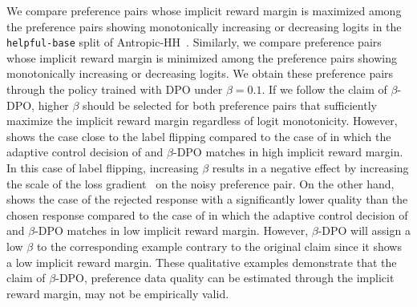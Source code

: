 We compare preference pairs whose implicit reward margin is maximized among the preference pairs showing monotonically increasing or decreasing logits in the \texttt{helpful-base} split of Antropic-HH~\cite{bai2022training}. Similarly, we compare preference pairs whose implicit reward margin is minimized among the preference pairs showing monotonically increasing or decreasing logits. We obtain these preference pairs through the policy trained with DPO under $\beta=0.1$. If we follow the claim of $\beta$-DPO, higher $\beta$ should be selected for both preference pairs that sufficiently maximize the implicit reward margin regardless of logit monotonicity. However,  shows the case close to the label flipping compared to the case of  in which the adaptive control decision of \method{} and $\beta$-DPO matches in high implicit reward margin. In this case of label flipping, increasing $\beta$ results in a negative effect by increasing the scale of the loss gradient~\cite{rafailov2023direct} on the noisy preference pair. On the other hand,  shows the case of the rejected response with a significantly lower quality than the chosen response compared to the case of  in which the adaptive control decision of \method{} and $\beta$-DPO matches in low implicit reward margin. However, $\beta$-DPO will assign a low $\beta$ to the corresponding example contrary to the original claim since it shows a low implicit reward margin. These qualitative examples demonstrate that the claim of $\beta$-DPO, preference data quality can be estimated through the implicit reward margin, may not be empirically valid.








